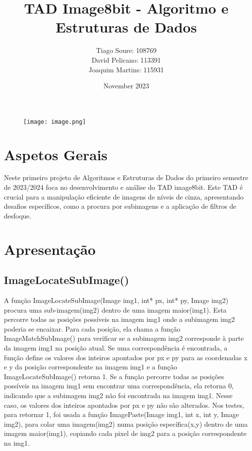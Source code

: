 \documentclass{article}
\title{TAD Image8bit - Algoritmo e Estruturas de Dados}
\author{
  Tiago Soure: 108769 \\
  David Pelicano: 113391 \\
  Joaquim Martins: 115931 \\ 
}
\date{November 2023}
\begin{document}
\maketitle

\begin{figure}[H]
  \centering
  \texttt{[image: image.png]}
\end{figure}  

\newpage
\renewcommand\contentsname{Índice}
\tableofcontents 
\newpage


\section{Aspetos Gerais}
Neste primeiro projeto de Algoritmos e Estruturas de Dados do primeiro semestre de 2023/2024 foca no desenvolvimento e análise do TAD image8bit. Este TAD é crucial para a manipulação eficiente de imagens de níveis de cinza, apresentando desafios específicos, como a procura por subimagens e a aplicação de filtros de desfoque.

\section{Apresentação}
\subsection{ImageLocateSubImage()}

A função ImageLocateSubImage(Image img1, int* px, int* py, Image img2) procura uma sub-imagem(img2) dentro
de uma imagem maior(img1). Esta percorre todas as posições possíveis na imagem img1 onde a subimagem img2
poderia se encaixar. 
Para cada posição, ela chama a função ImageMatchSubImage() para verificar se a subimagem img2 
corresponde à parte da imagem img1 na posição atual.
Se uma correspondência é encontrada, a função define os valores dos inteiros apontados por px e
py para as coordenadas x e y da posição correspondente na imagem img1 e a função ImageLocateSubImage() retorna 1.
Se a função percorre todas as posições possíveis na imagem img1 sem encontrar uma correspondência,
ela retorna 0, indicando que a subimagem img2 não foi encontrada na imagem img1. Nesse caso, os valores
dos inteiros apontados por px e py não são alterados.
Nos testes, para retornar 1, foi usada a função ImagePaste(Image img1, int x, int y, Image img2),
para colar uma imagem(img2) numa posição específica(x,y) dentro de uma imagem maior(img1), copiando
cada pixel de img2 para a posição correspondente na img1.
\end{document}
